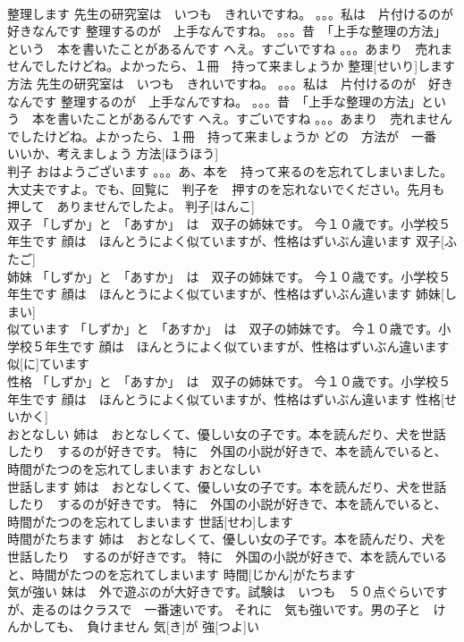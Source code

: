 \documentclass[8pt]{extreport}
\begin{document}
\begin{CJK}{UTF8}{min}
\\	整理します	先生の研究室は　いつも　きれいですね。 。。。私は　片付けるのが　好きなんです 整理するのが　上手なんですね。 。。。昔　「上手な整理の方法」という　本を書いたことがあるんです へえ。すごいですね 。。。あまり　売れませんでしたけどね。よかったら、１冊　持って来ましょうか	整理[せいり]します			
\\	方法	先生の研究室は　いつも　きれいですね。 。。。私は　片付けるのが　好きなんです 整理するのが　上手なんですね。 。。。昔　「上手な整理の方法」という　本を書いたことがあるんです へえ。すごいですね 。。。あまり　売れませんでしたけどね。よかったら、１冊　持って来ましょうか どの　方法が　一番　いいか、考えましょう	方法[ほうほう]			
\\	判子	おはようございます 。。。あ、本を　持って来るのを忘れてしまいました。 大丈夫ですよ。でも、回覧に　判子を　押すのを忘れないでください。先月も　押して　ありませんでしたよ。	判子[はんこ]			
\\	双子	「しずか」と　「あすか」　は　双子の姉妹です。 今１０歳です。小学校５年生です 顔は　ほんとうによく似ていますが、性格はずいぶん違います	双子[ふたご]			
\\	姉妹	「しずか」と　「あすか」　は　双子の姉妹です。 今１０歳です。小学校５年生です 顔は　ほんとうによく似ていますが、性格はずいぶん違います	姉妹[しまい]					
\\	似ています	「しずか」と　「あすか」　は　双子の姉妹です。 今１０歳です。小学校５年生です 顔は　ほんとうによく似ていますが、性格はずいぶん違います	似[に]ています			
\\	性格	「しずか」と　「あすか」　は　双子の姉妹です。 今１０歳です。小学校５年生です 顔は　ほんとうによく似ていますが、性格はずいぶん違います	性格[せいかく]					
\\	おとなしい	姉は　おとなしくて、優しい女の子です。本を読んだり、犬を世話したり　するのが好きです。 特に　外国の小説が好きで、本を読んでいると、時間がたつのを忘れてしまいます	おとなしい			
\\	世話します	姉は　おとなしくて、優しい女の子です。本を読んだり、犬を世話したり　するのが好きです。 特に　外国の小説が好きで、本を読んでいると、時間がたつのを忘れてしまいます	世話[せわ]します			
\\	時間がたちます	姉は　おとなしくて、優しい女の子です。本を読んだり、犬を世話したり　するのが好きです。 特に　外国の小説が好きで、本を読んでいると、時間がたつのを忘れてしまいます	時間[じかん]がたちます			
\\	気が強い	妹は　外で遊ぶのが大好きです。試験は　いつも　５０点ぐらいですが、走るのはクラスで　一番速いです。 それに　気も強いです。男の子と　けんかしても、　負けません	気[き]が 強[つよ]い					

\end{CJK}
\end{document}
